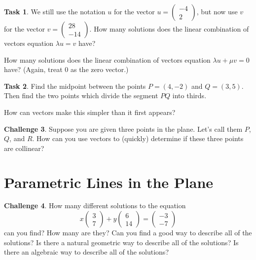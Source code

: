 \documentclass{tufte-book}
\theoremstyle{definition}
\newtheorem{task}{Task}
\newtheorem{challenge}[task]{Challenge}
\begin{document}
\begin{task}
We still use the notation $u$ for the vector $u = \left(\begin{smallmatrix} -4 \\ 2\end{smallmatrix}\right)$, but now use $v$ for the vector $v = \left(\begin{smallmatrix} 28 \\ -14\end{smallmatrix}\right)$.
How many solutions does the linear combination of vectors equation $\lambda u = v$
have?

How many solutions does the linear combination of vectors equation 
$\lambda u + \mu v = 0$ have? (Again, treat $0$ as the zero vector.)
\end{task}

\begin{task}
Find the midpoint between the points $P = (4,-2)$ and $Q=(3,5)$. Then find the two points which divide the segment $PQ$ into thirds.

How can vectors make this simpler than it first appears?
\end{task}

\begin{challenge}
Suppose you are given three points in the plane. Let's call them $P$, $Q$, and $R$.
How can you use vectors to (quickly) determine if these three points are collinear?
\end{challenge}

\section*{Parametric Lines in the Plane}

\begin{challenge}
How many different solutions to the equation
\[
x\begin{pmatrix} 3 \\ 7\end{pmatrix} + y \begin{pmatrix} 6 \\ 14 \end{pmatrix}
= \begin{pmatrix} -3 \\ -7 \end{pmatrix}
\]
can you find? How many are they? Can you find a good way to describe all of the solutions? Is there a natural geometric way to describe all of the solutions? Is there an algebraic way to describe all of the solutions?
\end{challenge}
\end{document}
